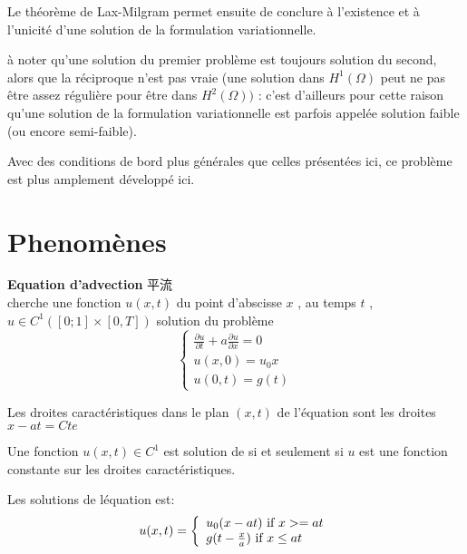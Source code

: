 \documentclass{article}
\begin{document}
Le th\'eor\`eme de Lax-Milgram permet ensuite de conclure \`a l'existence et \`a l'unicit\'e d'une solution de la formulation variationnelle.

\`a noter qu'une solution du premier probl\`eme est toujours solution du second, alors que la r\'eciproque n'est pas vraie (une solution dans $  H^1(\Omega)$   peut ne pas \^etre assez r\'eguli\`ere pour \^etre dans $  H^2(\Omega)) $  : c'est d'ailleurs pour cette raison qu'une solution de la formulation variationnelle est parfois appel\'ee solution faible (ou encore semi-faible).

Avec des conditions de bord plus g\'en\'erales que celles pr\'esent\'ees ici, ce probl\`eme est plus amplement d\'evelopp\'e ici.

\section{Phenom\`enes}
\textbf{Equation d'advection}
平流\\
cherche une fonction $u(x,t)$ du point d'abscisse $ x$ , au temps $ t$ , $ u \in C^1([0;1] \times [0,T])$ solution du probl\`eme
\begin{equation}
\left\{
  \begin{array}{ll}
		  \frac{\partial  u}{\partial t} + a \frac{\partial u}{\partial x } = 0 \\
		  u(x,0) = u_0{x} \\
		  u(0,t) = g(t)
  \end{array}
\right.
\end{equation}
\begin{definition}
		Les droites caract\'eristiques dans le plan $(x,t)$ de l'\'equation \lasteq  sont les droites$
x - at = Cte$
\end{definition}

\begin{proposition}
		Une fonction $ u(x,t) \in C^1$  est solution de \lasteq  si et seulement si $ u$  est une
fonction constante sur les droites caract\'eristiques.
\end{proposition}

Les solutions de l\'equation \lasteq est:
\begin{equation}
u(x,t)=
\left\{
  \begin{array}{ll}
		  u_0(x-at) \textrm{\ if } x >= at \\
		  g(t-\frac{x}{a}) \textrm{\ if } x \leq at
  \end{array}
\right.
\end{equation}
\bigskip
\end{document}

